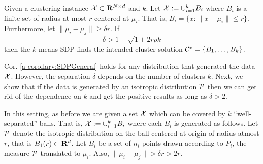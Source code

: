 \begin{corollary}
\label{a-corollary:SDPGeneral}
Given a clustering instance $\mathcal X \subset \mathbf R^{N\times d}$ and $k$. Let $\mathcal X := \cup_{i=1}^k B_i$ where $B_i$ is a finite set of radius at most $r$ centered at $\mu_i$. That is, $B_i = \{x : \|x -\mu_i\| \le r\}$. Furthermore, let $\|\mu_i - \mu_j\| \ge \delta r$. If 
$$\delta > 1 + \sqrt{1+ 2r\rho k}$$ 
then the $k$-means SDP finds the intended cluster solution  $\mathcal C^* = \{B_1, \ldots, B_k\}$.
\end{corollary}

\noindent Cor. \ref{a-corollary:SDPGeneral} holds for any distribution that generated the data $\mathcal X$. However, the separation $\delta$ depends on the number of clusters $k$. Next, we show that if the data is generated by an isotropic distribution $\mathcal P$ then we can get rid of the dependence on $k$ and get the positive results as long as $\delta > 2$. 

In this setting, as before we are given a set $\mathcal X$ which can be covered by $k$ ``well-separated'' balls. That is, $\mathcal X := \cup_{i=1}^k B_i$ where each $B_i$ is generated as follows. Let $\mathcal P$ denote the isotropic distribution on the ball centered at origin of radius atmost $r$, that is $B_1(r)\subset \mathbf R^d$. Let $B_i$ be a set of $n_i$ points drawn according to $P_i$, the measure $\mathcal P$ translated to $\mu_i$. Also, $\|\mu_i - \mu_j\| > \delta r > 2r$. 



